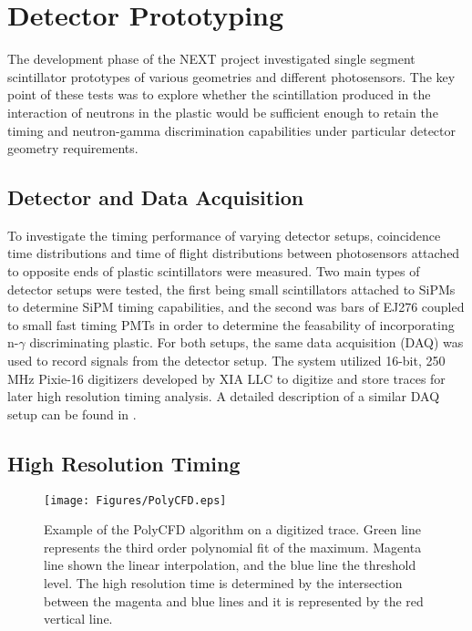 

\section{Detector Prototyping}
The development phase of the NEXT project investigated single segment scintillator prototypes of various geometries and different photosensors. The key point of these tests was to explore whether the scintillation produced in the interaction of neutrons in the plastic would be sufficient enough to retain the timing and neutron-gamma discrimination capabilities under particular detector geometry requirements.

\subsection{Detector and Data Acquisition}
To investigate the timing performance of varying detector setups, coincidence time distributions and time of flight distributions between photosensors attached to opposite ends of plastic scintillators were measured. Two main types of detector setups were tested, the first being small scintillators attached to SiPMs to determine SiPM timing capabilities, and the second was bars of EJ276 coupled to small fast timing PMTs in order to determine the feasability of incorporating n-$\gamma$  discriminating plastic. For both setups, the same data acquisition (DAQ) was used to record signals from the detector setup. The system utilized 16-bit, 250 MHz Pixie-16 digitizers developed by XIA LLC \cite{XIA} to digitize and store traces for later high resolution timing analysis. A detailed description of a similar DAQ setup can be found in \cite{PAULAUSKAS201422}.

\subsection{High Resolution Timing} \label{sec:HRT}
\begin{figure}[bt]
\centering
\texttt{[image: Figures/PolyCFD.eps]}
\caption{Example of the PolyCFD algorithm on a digitized trace. Green line represents the third order polynomial fit of the maximum. Magenta line shown the linear interpolation, and the blue line the threshold level. The high resolution time is determined by the intersection between the magenta and blue lines and it is represented by the red vertical line.}
\label{fig:PolyCFD}
\end{figure}

